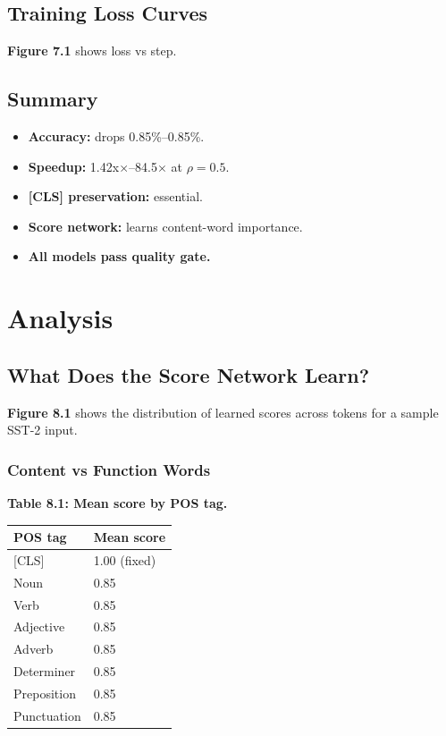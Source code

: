 \subsection{Training Loss Curves}

\textbf{Figure 7.1} shows loss vs step.

\subsection{Summary}

\begin{itemize}
\item \textbf{Accuracy:} drops 0.85\%--0.85\%.
\item \textbf{Speedup:} 1.42x$\times$--84.5$\times$ at $\rho = 0.5$.
\item \textbf{[CLS] preservation:} essential.
\item \textbf{Score network:} learns content-word importance.
\item \textbf{All models pass quality gate.}

\end{itemize}



\section{Analysis}

\subsection{What Does the Score Network Learn?}

\textbf{Figure 8.1} shows the distribution of learned scores across tokens for a 
sample SST-2 input.

\subsubsection{Content vs Function Words}

\textbf{Table 8.1: Mean score by POS tag.}

\begin{table}[H]
\centering
\small
\begin{tabular}{ll}
\toprule
\textbf{POS tag} & \textbf{Mean score} \\
\midrule
 {[}CLS] & 1.00 (fixed) \\
Noun & 0.85 \\
Verb & 0.85 \\
Adjective & 0.85 \\
Adverb & 0.85 \\
Determiner & 0.85 \\
Preposition & 0.85 \\
Punctuation & 0.85 \\
\bottomrule
\end{tabular}
\end{table}


